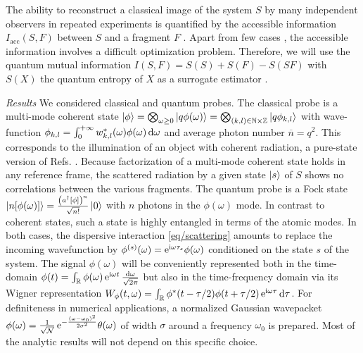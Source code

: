 The ability to reconstruct a classical image of the system $S$ by
many independent observers in repeated experiments
is quantified by the accessible information
$I_{\text{acc}}(S,F)$ between $S$ and a fragment $F$
\cite{Touil-2022-1}. Apart from few cases \cite{Yao-2014-1}, the
accessible information involves a difficult optimization problem. 
Therefore, we will use the quantum mutual information 
$I(S,F) = S(S) + S(F) - S(SF)$ with $S(X)$ the quantum 
entropy of $X$ as a surrogate estimator \cite{Ollivier-2004-1}. 


\emph{Results} We considered classical and quantum probes.
The classical probe is a multi-mode coherent state
$
\ket{\phi} = \bigotimes_{\omega\geq 0} \ket{q\phi(\omega)}
	=\bigotimes_{(k,l)\in\mathbb{N}\times\mathbb{Z}} \ket{q\phi_{k,l}}
$
with wave-function $\phi_{k,l} = \int_0^{+\infty} 
w_{k,l}^*(\omega) \phi(\omega) \, \mathrm{d} \omega$ and
average photon number $\overline{n}=q^2$. This corresponds to the
illumination of an object with coherent radiation, a pure-state version
of Refs. \cite{Riedel-2010-1,Riedel-2011-1}. Because factorization
of a multi-mode coherent state holds in any reference frame, the
scattered radiation by a given state $\ket{s}$ of $S$ shows
no correlations between the various fragments.
%
The quantum probe is a Fock state $\ket{n[\phi(\omega)]}
= \frac{\left(a^\dagger[\phi] \right)^n}{\sqrt{n!}}\ket{0}$
with $n$ photons in the $\phi(\omega)$ mode. In contrast to 
coherent states, such a state is highly entangled in terms
of the atomic modes. 
In both cases, the dispersive interaction \cref{eq/scattering} 
amounts to replace the incoming wavefunction by 
$\phi^{(s)}(\omega)=\mathrm{e}^{\mathrm{i}\omega\tau_s}\phi(\omega)$
conditioned on the state $s$ of the system. 
The signal $\phi(\omega)$ will be conveniently represented
both in the time-domain 
$\phi(t) = \int_{\mathbb{R}} \phi(\omega) 
	\,\mathrm{e}^{\mathrm{i} \omega t}
	\, \frac{\mathrm{d} \omega}{\sqrt{2\pi}}
$
but also in the time-frequency domain via its Wigner
representation 
$W_\phi(t,\omega) = \int_{\mathbb{R}} \phi^*(t-\tau/2)
\phi(t+\tau/2) \, \mathrm{e}^{\mathrm{i}\omega\tau} \, \mathrm{d}\tau$.
%
For definiteness in numerical applications, 
a normalized Gaussian wavepacket
$\phi(\omega) = \frac{1}{\sqrt{\mathcal{N}}} 
	\,\mathrm{e}^{-\frac{(\omega-\omega_0)^2}{2\sigma^2}}
\theta(\omega)$
of width $\sigma$ around a frequency $\omega_0$ is prepared.
Most of the analytic results will not depend on this specific
choice. 

